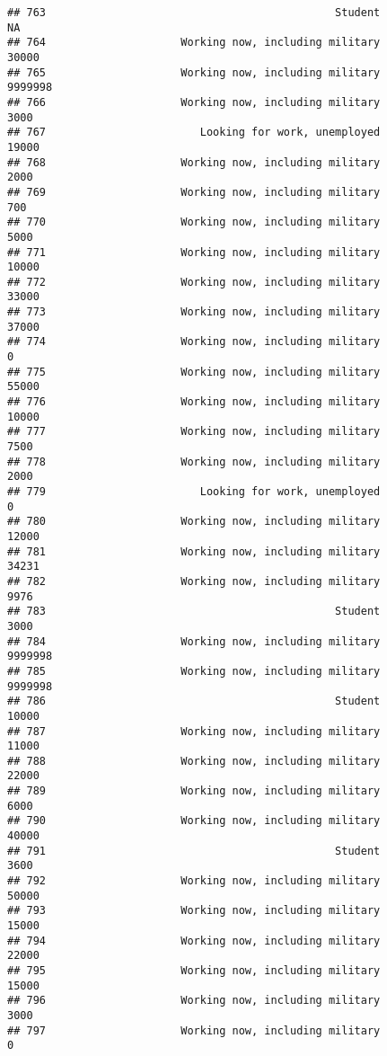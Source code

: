 \documentclass[]{book}
\theoremstyle{definition}
\theoremstyle{definition}
\theoremstyle{remark}
\begin{document}
\begin{verbatim}
## 763                                             Student              NA
## 764                     Working now, including military           30000
## 765                     Working now, including military         9999998
## 766                     Working now, including military            3000
## 767                        Looking for work, unemployed           19000
## 768                     Working now, including military            2000
## 769                     Working now, including military             700
## 770                     Working now, including military            5000
## 771                     Working now, including military           10000
## 772                     Working now, including military           33000
## 773                     Working now, including military           37000
## 774                     Working now, including military               0
## 775                     Working now, including military           55000
## 776                     Working now, including military           10000
## 777                     Working now, including military            7500
## 778                     Working now, including military            2000
## 779                        Looking for work, unemployed               0
## 780                     Working now, including military           12000
## 781                     Working now, including military           34231
## 782                     Working now, including military            9976
## 783                                             Student            3000
## 784                     Working now, including military         9999998
## 785                     Working now, including military         9999998
## 786                                             Student           10000
## 787                     Working now, including military           11000
## 788                     Working now, including military           22000
## 789                     Working now, including military            6000
## 790                     Working now, including military           40000
## 791                                             Student            3600
## 792                     Working now, including military           50000
## 793                     Working now, including military           15000
## 794                     Working now, including military           22000
## 795                     Working now, including military           15000
## 796                     Working now, including military            3000
## 797                     Working now, including military               0

\end{verbatim}
\end{document}
